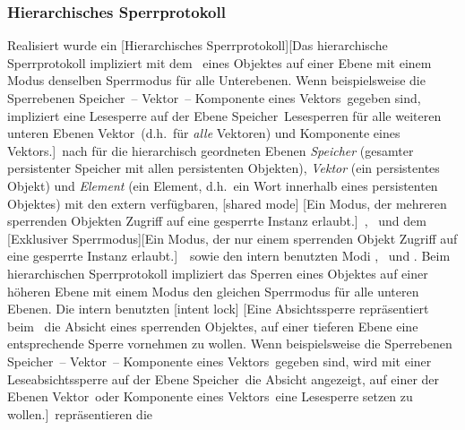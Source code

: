 \subsubsection{Hierarchisches Sperrprotokoll}
%
Realisiert wurde ein [Hierarchisches
Sperrprotokoll][{Das hierarchische Sperrprotokoll impliziert mit dem
\protect{}\ eines Objektes auf einer Ebene mit einem Modus
denselben Sperrmodus f\"{u}r alle Unterebenen. Wenn beispielsweise die
Sperrebenen \protect\rglq{}Speicher\protect\rgrq\ --
\protect\rglq{}Vektor\protect\rgrq\ -- \protect\rglq{}Komponente eines
Vektors\protect\rgrq\ gegeben sind, impliziert eine Lesesperre auf der
Ebene \protect\rglq{}Speicher\protect\rgrq\ Lesesperren f\"{u}r alle
weiteren unteren Ebenen \protect\rglq{}Vektor\protect\rgrq\ (d.h.\ f\"{u}r
{\protect\em alle\/} Vektoren) und \protect\rglq{}Komponente eines
Vektors\protect\rgrq.}]\ nach \cite[]{bib:gr93} f\"{u}r die
hierarchisch geordneten Ebenen {\em Speicher\/} (gesamter persistenter
Speicher mit allen persistenten Objekten), {\em Vektor\/} (ein
persistentes Objekt) und {\em Element\/} (ein Element, d.h.\ ein Wort
innerhalb eines persistenten Objektes) mit den extern verf\"{u}gbaren,
%
[shared mode]%
[Ein Modus, der mehreren sperrenden Objekten Zugriff auf eine
gesperrte Instanz erlaubt.]\ ,
\ und dem
[Exklusiver
Sperrmodus][Ein Modus, der nur einem sperrenden
Objekt Zugriff auf eine gesperrte Instanz
erlaubt.]\ \ sowie den intern benutzten Modi
,
\ und
.
Beim hierarchischen Sperrprotokoll impliziert das Sperren eines
Objektes auf einer h\"{o}heren Ebene mit einem Modus den gleichen
Sperrmodus f\"{u}r alle unteren Ebenen. Die intern benutzten
%
[intent lock]%
[{Eine Absichtssperre repr\"{a}sentiert beim
\protect{}\ die Absicht eines
sperrenden Objektes, auf einer tieferen Ebene eine entsprechende
Sperre vornehmen zu wollen. Wenn beispielsweise die
Sperrebenen \protect\rglq{}Speicher\protect\rgrq\ --
\protect\rglq{}Vektor\protect\rgrq\ -- \protect\rglq{}Komponente eines
Vektors\protect\rgrq\ gegeben sind, wird mit einer
Leseabsichtssperre auf der Ebene
\protect\rglq{}Speicher\protect\rgrq\ die Absicht angezeigt, auf einer
der Ebenen \protect\rglq{}Vektor\protect\rgrq\ oder
\protect\rglq{}Komponente eines Vektors\protect\rgrq\ eine
Lesesperre setzen zu wollen.}]\ repr\"{a}sentieren die
